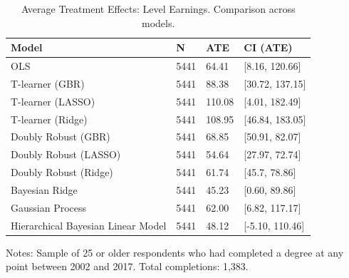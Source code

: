 \documentclass[12pt, a4paper]{article}
\begin{document}
\begin{landscape}
\clearpage
\begin{table}[htbp]
\centering
\small
\caption{Average Treatment Effects: Level Earnings. Comparison across models.}
\begin{tabular}{p{} C{0.1\textwidth} C{0.1\textwidth} C{0.2\textwidth}}
\toprule
Model  &  N  &  ATE  &  CI (ATE)  \\
\midrule 	   						
OLS	 & 	5441	 & 	64.41	 & 	[8.16, 120.66]	 \\
T-learner (GBR)	 & 	5441	 & 	88.38	 & 	[30.72, 137.15]	 \\
T-learner (LASSO)	 & 	5441	 & 	110.08	 & 	[4.01, 182.49]	 \\
T-learner (Ridge)	 & 	5441	 & 	108.95	 & 	[46.84, 183.05]	 \\
Doubly Robust (GBR)	 & 	5441	 & 	68.85	 & [50.91, 82.07] \\
Doubly Robust (LASSO)	 & 	5441	 & 	54.64	 & 	[27.97, 72.74]	 \\
Doubly Robust (Ridge)	 & 	5441	 & 	61.74	 & 	[45.7, 78.86]	 \\
Bayesian Ridge	 & 	5441	 & 	45.23	 & 	[0.60, 89.86]	 \\
Gaussian Process	 & 	5441	 & 	62.00	 & 	[6.82, 117.17]	 \\
Hierarchical Bayesian Linear Model	 & 	5441	 & 	48.12 & [-5.10, 110.46]  \\
\bottomrule
\end{tabular}
\par\medskip
\parbox{1.0\textwidth}{\footnotesize Notes: Sample of 25 or older respondents who had completed a degree at any point between 2002 and 2017. Total completions: 1,383.}
\label{tab:atebslvl}
\end{table}










\end{landscape}
\end{document}
